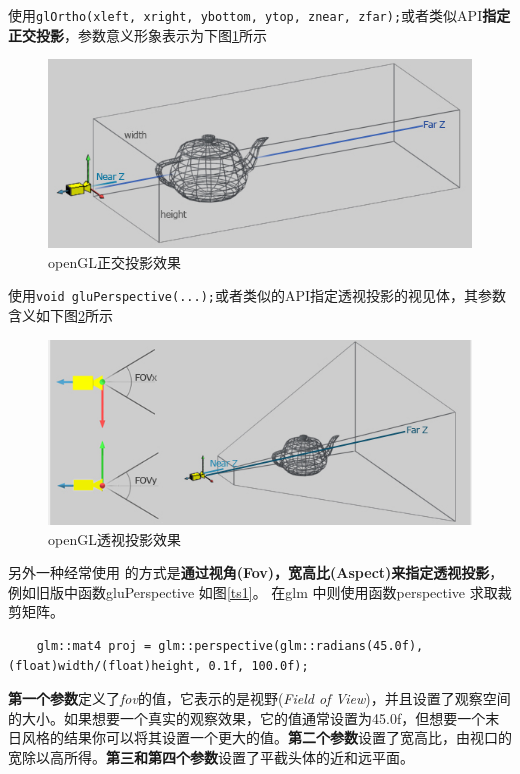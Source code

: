 \documentclass[UTF8,a4paper,12pt]{ctexbook}
\begin{document}
			使用\verb|glOrtho(xleft, xright, ybottom, ytop, znear, zfar);|或者类似API\textbf{指定正交投影}，参数意义形象表示为下图\ref{zhengjiao}所示
				\begin{figure}[H]
					\centering
					\includegraphics[width=.8\linewidth]{Ortho.png}
					\caption{openGL正交投影效果}
					\label{zhengjiao}
				\end{figure}
			
			使用\verb|void gluPerspective(...);|或者类似的API指定透视投影的视见体，其参数含义如下图\ref{toushi}所示
				\begin{figure}[H]
					\centering
					\includegraphics[width=.8\linewidth]{project3.png}
					\caption{openGL透视投影效果}
					\label{toushi}
				\end{figure}
				
			另外一种经常使用 的方式是\textbf{通过视角(Fov)，宽高比(Aspect)来指定透视投影}，例如旧版中函数gluPerspective 如图\ref{ts1}。
			在glm 中则使用函数perspective 求取裁剪矩阵。
			\begin{lstlisting}
	glm::mat4 proj = glm::perspective(glm::radians(45.0f), (float)width/(float)height, 0.1f, 100.0f);		
			\end{lstlisting}
			
			\textbf{第一个参数}定义了\textit{fov}的值，它表示的是视野(\textit{Field of View})，并且设置了观察空间的大小。如果想要一个真实的观察效果，它的值通常设置为45.0f，但想要一个末日风格的结果你可以将其设置一个更大的值。\textbf{第二个参数}设置了宽高比，由视口的宽除以高所得。\textbf{第三和第四个参数}设置了平截头体的近和远平面。
				
\end{document}
